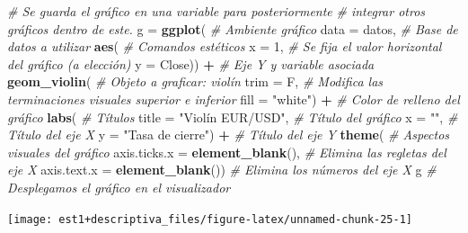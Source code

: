 \documentclass[
  11pt,
]{book}
\newenvironment{Shaded}{\begin{snugshade}}{\end{snugshade}}
\newcommand{\AttributeTok}[1]{\textcolor[rgb]{0.13,0.29,0.53}{#1}}
\newcommand{\CommentTok}[1]{\textcolor[rgb]{0.56,0.35,0.01}{\textit{#1}}}
\newcommand{\DecValTok}[1]{\textcolor[rgb]{0.00,0.00,0.81}{#1}}
\newcommand{\FunctionTok}[1]{\textcolor[rgb]{0.13,0.29,0.53}{\textbf{#1}}}
\newcommand{\NormalTok}[1]{#1}
\newcommand{\OtherTok}[1]{\textcolor[rgb]{0.56,0.35,0.01}{#1}}
\newcommand{\SpecialCharTok}[1]{\textcolor[rgb]{0.81,0.36,0.00}{\textbf{#1}}}
\newcommand{\StringTok}[1]{\textcolor[rgb]{0.31,0.60,0.02}{#1}}
\theoremstyle{definition}
\theoremstyle{definition}
\theoremstyle{definition}
\theoremstyle{definition}
\theoremstyle{remark}
\begin{document}
\begin{Shaded}
\begin{Highlighting}[]
\CommentTok{\# Se guarda el gráfico en una variable para posteriormente}
\CommentTok{\# integrar otros gráficos dentro de este.}
\NormalTok{g }\OtherTok{=} \FunctionTok{ggplot}\NormalTok{( }\CommentTok{\# Ambiente gráfico}
  \AttributeTok{data =}\NormalTok{ datos, }\CommentTok{\# Base de datos a utilizar}
  \FunctionTok{aes}\NormalTok{( }\CommentTok{\# Comandos estéticos}
    \AttributeTok{x =} \DecValTok{1}\NormalTok{, }\CommentTok{\# Se fija el valor horizontal del gráfico (a elección)}
    \AttributeTok{y =}\NormalTok{ Close)) }\SpecialCharTok{+} \CommentTok{\# Eje Y y variable asociada}
  \FunctionTok{geom\_violin}\NormalTok{( }\CommentTok{\# Objeto a graficar: violín}
    \AttributeTok{trim =}\NormalTok{ F, }\CommentTok{\# Modifica las terminaciones visuales superior e inferior}
    \AttributeTok{fill =} \StringTok{"white"}\NormalTok{) }\SpecialCharTok{+} \CommentTok{\# Color de relleno del gráfico}
  \FunctionTok{labs}\NormalTok{( }\CommentTok{\# Títulos}
    \AttributeTok{title =} \StringTok{"Violín EUR/USD"}\NormalTok{, }\CommentTok{\# Título del gráfico}
    \AttributeTok{x =} \StringTok{""}\NormalTok{, }\CommentTok{\# Título del eje X}
    \AttributeTok{y =} \StringTok{"Tasa de cierre"}\NormalTok{) }\SpecialCharTok{+} \CommentTok{\# Título del eje Y}
  \FunctionTok{theme}\NormalTok{( }\CommentTok{\# Aspectos visuales del gráfico}
    \AttributeTok{axis.ticks.x =} \FunctionTok{element\_blank}\NormalTok{(), }\CommentTok{\# Elimina las regletas del eje X}
    \AttributeTok{axis.text.x =} \FunctionTok{element\_blank}\NormalTok{()) }\CommentTok{\# Elimina los números del eje X}
\NormalTok{g }\CommentTok{\# Desplegamos el gráfico en el visualizador}
\end{Highlighting}
\end{Shaded}

\begin{center}\texttt{[image: est1+descriptiva\_files/figure-latex/unnamed-chunk-25-1]} \end{center}
\end{document}
